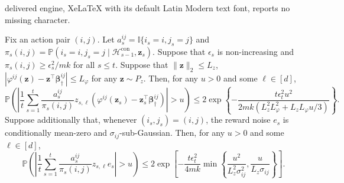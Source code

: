 \documentclass[10pt,a4paper]{amsart}
\begin{document}
delivered engine, XeLaTeX with its default Latin Modern text font, reports no missing character.
\begin{lemma}
\label{lem:context_ipw_score_concentration}
Fix an action pair $(i,j)$. Let $a_s^{ij}=\mathbb I\{i_s=i,j_s=j\}$ and $\pi_s(i,j)=\mathbb P\left(i_s=i,j_s=j\mid\mathcal H_{s-1}^{\mathrm{con}},\bm z_s\right)$.
Suppose that $\epsilon_s$ is non-increasing and $\pi_s(i,j)\ge {\epsilon_s^2}/{mk}$ for all $s\le t$.
Suppose that $\|\bm z\|_2 \le L_z$, $|\varphi^{ij}(\bm z) - \bm z^\top\bm\beta_\dagger^{ij}| \le L_\varphi$ for any $\bm{z} \sim P_z$. 
Then, for any $u>0$ and some $\ell \in [d]$,
\begin{equation}
\label{equ:ipw_approximation_score_tail}
\mathbb P
\left(\left|
\frac{1}{t}\sum_{s=1}^t\frac{a_s^{ij}}{\pi_s(i,j)}z_{s,\ell} \left(\varphi^{ij}(\bm z_s) - \bm z_s^\top\bm\beta_\dagger^{ij}\right)\right|> u \right)
\le
2\exp\left\{-\frac{t\epsilon_t^2u^2}{2mk\left(L_z^2L_\varphi^2+L_zL_\varphi u/3\right)}\right\}.    
\end{equation}
Suppose additionally that, whenever $(i_s,j_s)=(i,j)$, the reward noise $e_s$ is conditionally mean-zero and $\sigma_{ij}$-sub-Gaussian. Then, for any $u>0$ and some $\ell \in [d]$,
\begin{equation}
\label{equ:ipw_noise_score_tail}
\mathbb P
\left(\left|
\frac{1}{t}\sum_{s=1}^t\frac{a_s^{ij}}{\pi_s(i,j)}z_{s,\ell}e_s
\right|>u\right)
\le
2\exp\left[-\frac{t\epsilon_t^2}{4mk}\min\left\{\frac{u^2}{L_z^2\sigma_{ij}^2},\frac{u}{L_z\sigma_{ij}}
\right\}
\right].
\end{equation}
\end{lemma}
\end{document}
